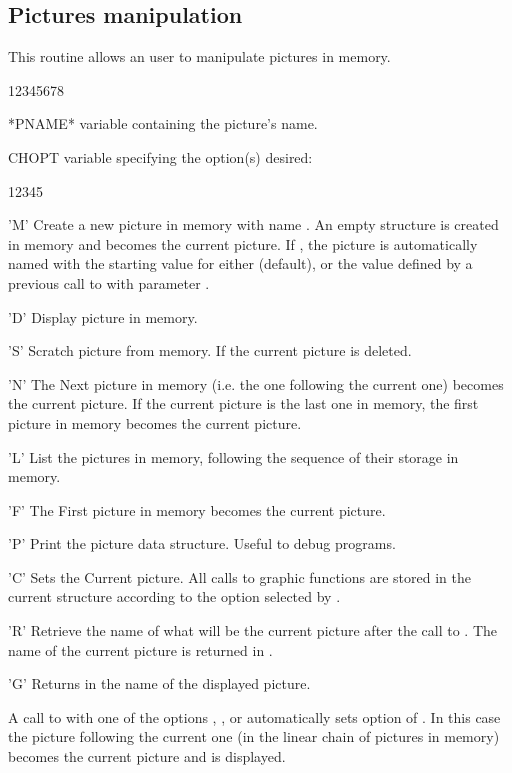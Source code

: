 \subsection{Pictures manipulation}
\Action
This routine allows an \HIGZ{} user to manipulate \HIGZ{} pictures in memory.
\Pdesc
\begin{DLtt}{12345678}
\item[*PNAME*]  variable containing the picture's name.
\item[CHOPT]  variable specifying the option(s) desired:
\begin{DLtt}{12345}
\item['M'] Create a new picture in memory with name .
           An empty structure is created in memory and becomes
           the current picture. If , the picture is
           automatically named  with the starting
           value for  either  (default), or the value
           defined by a previous call to  with parameter
           .
\item['D'] Display picture  in memory.
\item['S'] Scratch picture  from memory.
           If  the current picture is deleted.
\item['N'] The Next picture in memory (i.e. the one
           following the current one) becomes the current picture.
           If the current picture is the last one in memory,
           the first picture in memory becomes the current picture.
\item['L'] List the pictures in memory,
           following the sequence of their storage in memory.
\item['F'] The First picture in memory becomes the current picture.
\item['P'] Print the picture data structure. Useful to debug programs.
\item['C'] Sets the Current picture. All calls to \HIGZ{} graphic functions are
           stored in the current structure according to the option selected
           by .
\item['R'] Retrieve the name of what will be the current picture after the call
           to . The name of the current picture is returned in
           .
\item['G'] Returns in  the name of the displayed picture.
\end{DLtt}
\end{DLtt}
\par
A call to  with one of the options , , 
or  automatically sets option  of . In this case
the picture following the current one (in the linear chain of pictures in
memory) becomes the current picture and is displayed.
